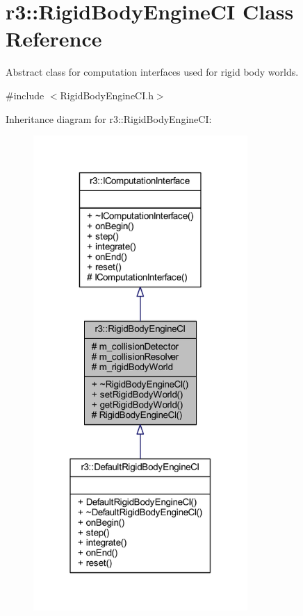 \hypertarget{classr3_1_1_rigid_body_engine_c_i}{}\section{r3\+:\+:Rigid\+Body\+Engine\+CI Class Reference}
\label{classr3_1_1_rigid_body_engine_c_i}


Abstract class for computation interfaces used for rigid body worlds.  




{\ttfamily \#include $<$Rigid\+Body\+Engine\+C\+I.\+h$>$}



Inheritance diagram for r3\+:\+:Rigid\+Body\+Engine\+CI\+:\nopagebreak
\begin{figure}[H]
\begin{center}
\leavevmode
\includegraphics[width=231pt]{classr3_1_1_rigid_body_engine_c_i__inherit__graph}
\end{center}
\end{figure}



